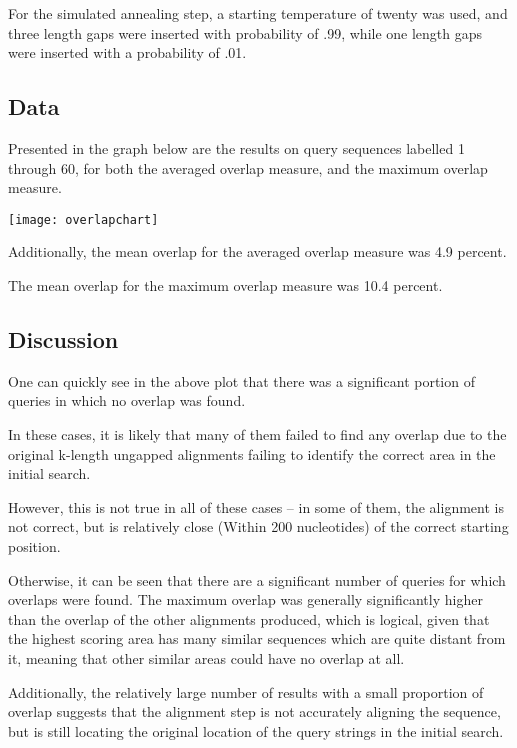 \documentclass[12pt, conference]{IEEEtran}
\begin{document}
    For the simulated annealing step, a starting temperature of twenty was used, and three length gaps were inserted with probability of .99, while one length gaps were inserted with a probability of .01.

    \subsection{\textbf{Data}}

    Presented in the graph below are the results on query sequences labelled 1 through 60, for both the averaged overlap measure, and the maximum overlap measure.

    \texttt{[image: overlapchart]}

    Additionally, the mean overlap for the averaged overlap measure was 4.9 percent.

    The mean overlap for the maximum overlap measure was 10.4 percent.

    \subsection{\textbf{Discussion}}

    One can quickly see in the above plot that there was a significant portion of queries in which no overlap was found.

    In these cases, it is likely that many of them failed to find any overlap due to the original k-length ungapped alignments failing to identify the correct area in the initial search.

    However, this is not true in all of these cases -- in some of them, the alignment is not correct, but is relatively close (Within 200 nucleotides) of the correct starting position.

    Otherwise, it can be seen that there are a significant number of queries for which overlaps were found. 
    The maximum overlap was generally significantly higher than the overlap of the other alignments produced, which is logical, given that the highest scoring area has many similar sequences which are quite distant from it, meaning that other similar areas could have no overlap at all.

    Additionally, the relatively large number of results with a small proportion of overlap suggests that the alignment step is not accurately aligning the sequence, but is still locating the original location of the query strings in the initial search.
\end{document}
